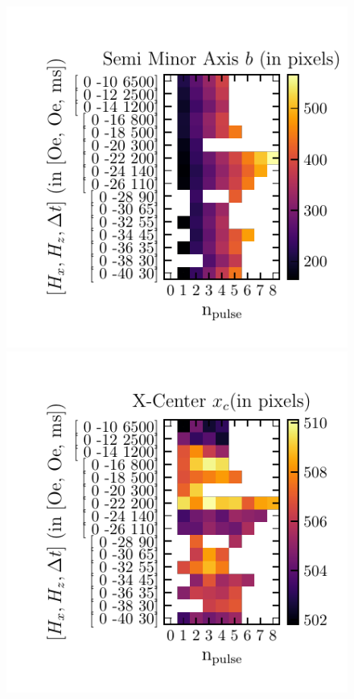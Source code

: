 \documentclass[12pt, twoside, a4paper]{article}
\begin{document}
\begin{figure}[!htbp]
	\includegraphics[scale=1.0]{figures/12_FitsFullSpace/0_1_2_3_4_5_6_7_8_9_10_11_12_13_14_15__Semi-Minor-Axis.pdf}\\
	\includegraphics[scale=1.0]{figures/12_FitsFullSpace/0_1_2_3_4_5_6_7_8_9_10_11_12_13_14_15__X-Center.pdf}

\end{figure}
\end{document}
